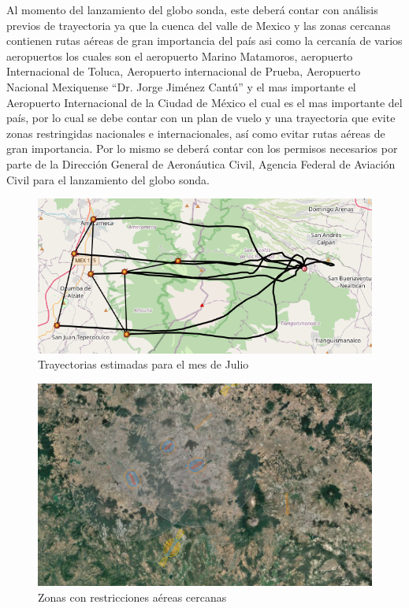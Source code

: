 \documentclass[letterpaper,12pt]{article} %
\begin{document}
    Al momento del lanzamiento del globo sonda, este deberá contar con análisis previos
    de trayectoria ya que la cuenca del valle de Mexico y las zonas cercanas contienen rutas
    aéreas de gran importancia del país asi como la cercanía de varios aeropuertos los cuales 
    son el aeropuerto Marino Matamoros, aeropuerto Internacional de Toluca, Aeropuerto internacional de Prueba, Aeropuerto Nacional Mexiquense “Dr. Jorge Jiménez Cantú”
    y el mas importante el Aeropuerto Internacional de la Ciudad de México el cual es el
    mas importante del país, por lo cual se debe contar con un plan de vuelo y una trayectoria 
    que evite zonas restringidas nacionales e internacionales, así como evitar rutas aéreas de gran importancia.
    Por lo mismo se deberá contar con los permisos necesarios por parte de la Dirección General de Aeronáutica Civil,
    Agencia Federal de Aviación Civil para el lanzamiento del globo sonda.

    \begin{figure}[H]
      \centerline{\includegraphics[width=1\textwidth]{Tray.png}}
      \caption{Trayectorias estimadas para el mes de Julio}
      \label{fig:Trayectoria}
    \end{figure}

    \begin{figure}[H]
      \centerline{\includegraphics[width=.8\textwidth]{Zonas.png}}
      \caption{Zonas con restricciones aéreas cercanas}
      \label{fig:Zonas}
    \end{figure}
\end{document}
